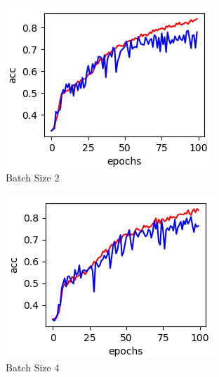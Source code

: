 \documentclass[../main.tex]{subfiles}
\begin{document}
\begin{figure}[h!]
  \centering
  \begin{subfigure}[b]{0.3\linewidth}
    \includegraphics[width=\linewidth]{batch-size-img/bs2.png}
    \caption{Batch Size 2}
  \end{subfigure}
  \begin{subfigure}[b]{0.3\linewidth}
    \includegraphics[width=\linewidth]{batch-size-img/bs4.png}
    \caption{Batch Size 4}
  \end{subfigure}
  \begin{subfigure}[b]{0.3\linewidth}

\end{subfigure}
\end{figure}
\end{document}
